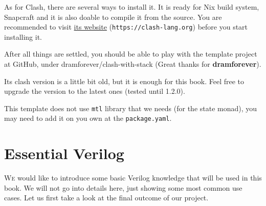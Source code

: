 \documentclass[a4paper,12pt, oneside]{book}
\begin{document}
As for Clash, there are several ways to install it. It is ready for Nix build system, Snapcraft and it is also doable to compile it from the source. You are recommended to visit \href{https://clash-lang.org}{its website} (\texttt{https://clash-lang.org}) before you start installing it.

After all things are settled, you should be able to play with the template project at GitHub, under dramforever/clash-with-stack (Great thanks for \textbf{dramforever}).

Its clash version is a little bit old, but it is enough for this book. Feel free to upgrade the version to the latest ones (tested until 1.2.0).

This template does not use \texttt{mtl} library that we needs (for the state monad), you may need to add it on you own at the \texttt{package.yaml}.
\chapter{Essential Verilog}
\lettrine{W}{e} would like to introduce some basic Verilog knowledge that will be used in this book. We will not go into details here, just showing some most common use cases. Let us first take a look at the final outcome of our project.
\end{document}
